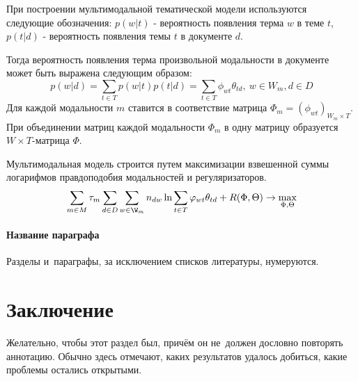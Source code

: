 \documentclass[12pt, twoside]{article}
\begin{document}
При построении мультимодальной тематической модели используются следующие обозначения: $p(w|t)$ - вероятность появления терма $w$ в теме $t$, $p(t|d)$ - вероятность появления темы $t$ в документе $d$. 

Тогда вероятность появления терма произвольной модальности в документе может быть выражена следующим образом:
\begin{equation}
	p(w|d) = \sum\limits_{t \in T}p(w|t)p(t|d) = \sum\limits_{t \in T}\phi_{wt}\theta_{td}, \ w \in W_m, d \in D
\end{equation}
Для каждой модальности $m$ ставится в соответствие матрица $\Phi_m = (\phi_{wt})_{W_m \times T}$. При объединении матриц каждой модальности $\Phi_m$ в одну матрицу образуется $W \times T$-матрица $\Phi$.

Мультимодальная модель строится путем максимизации взвешенной суммы логарифмов правдоподобия модальностей и регуляризаторов.
\begin{equation}
    \sum\limits_{m \in M} \tau_m \sum\limits_{d \in D} \sum\limits_{w \in \W_m} n_{dw} \ln \sum\limits_{t \in T} \phi_{wt}\theta_{td} + R(\Phi, \Theta) \rightarrow  \max_{\Phi, \Theta} %
\end{equation}
 
\paragraph{Название параграфа}
Разделы и~параграфы, за исключением списков литературы, нумеруются.

\section{Заключение}
Желательно, чтобы этот раздел был, причём он не~должен дословно повторять аннотацию.
Обычно здесь отмечают, каких результатов удалось добиться, какие проблемы остались открытыми.



\end{document}
